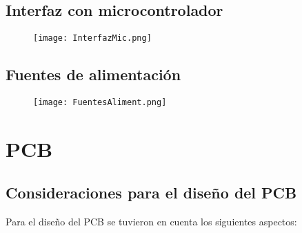 \subsection{Interfaz con microcontrolador}
\begin{figure}[H]
	\centering
	\texttt{[image: InterfazMic.png]}
	\label{fig:InterfazMic}
\end{figure}

\subsection{Fuentes de alimentación}
\begin{figure}[H]
	\centering
	\texttt{[image: FuentesAliment.png]}
	\label{fig:FuentesAliment}
\end{figure}

\section{PCB}
\subsection{Consideraciones para el diseño del PCB}
Para el diseño del PCB se tuvieron en cuenta los siguientes aspectos:

